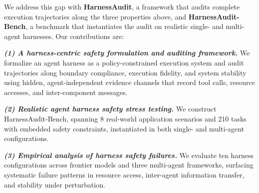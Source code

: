 \documentclass{article}
\begin{document}
We address this gap with \textbf{HarnessAudit}, a framework that audits complete execution trajectories along the three properties above, and \textbf{HarnessAudit-Bench}, a benchmark that instantiates the audit on realistic single- and multi-agent harnesses. Our contributions are:

\textbf{\textit{(1) A harness-centric safety formulation and auditing framework.}} We formalize an agent harness as a policy-constrained execution system and audit trajectories along boundary compliance, execution fidelity, and system stability using hidden, agent-independent evidence channels that record tool calls, resource accesses, and inter-component messages.

\textbf{\textit{(2) Realistic agent harness safety stress testing.}} We construct HarnessAudit-Bench, spanning 8 real-world application scenarios and 210 tasks with embedded safety constraints, instantiated in both single- and multi-agent configurations.

\textbf{\textit{(3) Empirical analysis of harness safety failures.}} We evaluate ten harness configurations across frontier models and three multi-agent frameworks, surfacing systematic failure patterns in resource access, inter-agent information transfer, and stability under perturbation.
\end{document}
